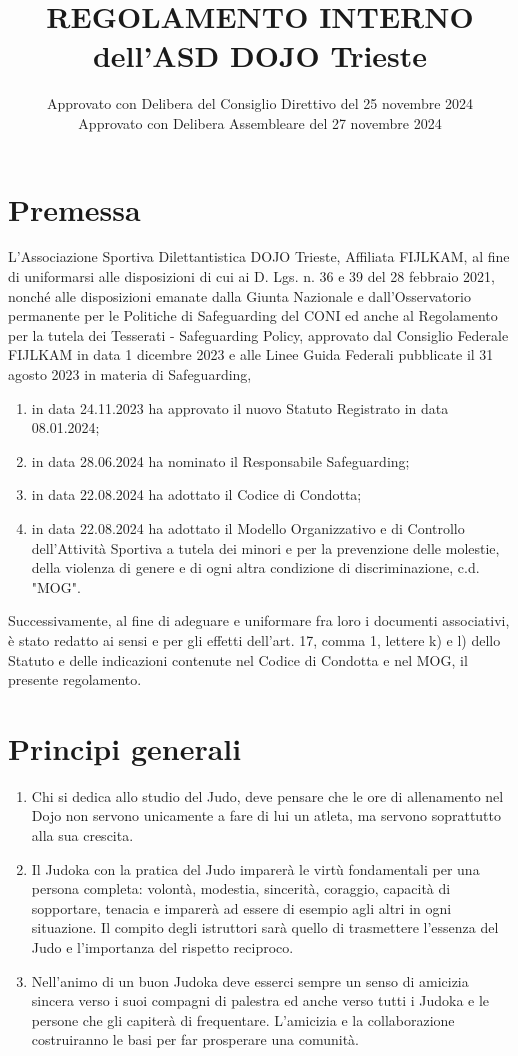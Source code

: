 \documentclass{djtsdoc}
\title{REGOLAMENTO INTERNO \\[2pt] dell'ASD DOJO Trieste}
\date{Approvato con Delibera del Consiglio Direttivo del 25 novembre 2024 \\ Approvato con Delibera Assembleare del 27 novembre 2024}
\begin{document}
	\maketitle
	
	\section*{Premessa}
	L'Associazione Sportiva Dilettantistica DOJO Trieste, Affiliata FIJLKAM, al fine di uniformarsi alle disposizioni di cui ai D. Lgs. n. 36 e 39 del 28 febbraio 2021, nonché alle disposizioni emanate dalla Giunta Nazionale e dall'Osservatorio permanente per le Politiche di Safeguarding del CONI ed anche al Regolamento per la tutela dei Tesserati - Safeguarding Policy, approvato dal Consiglio Federale FIJLKAM in data 1 dicembre 2023 e alle Linee Guida Federali pubblicate il 31 agosto 2023 in materia di Safeguarding,
	\begin{enumerate}[label = \alph*.]
		\item in data 24.11.2023 ha approvato il nuovo Statuto Registrato in data 08.01.2024;
		\item in data 28.06.2024 ha nominato il Responsabile Safeguarding;
		\item in data 22.08.2024 ha adottato il Codice di Condotta;
		\item in data 22.08.2024 ha adottato il Modello Organizzativo e di Controllo dell'Attività Sportiva a tutela dei minori e per la prevenzione delle molestie, della violenza di genere e di ogni altra condizione di discriminazione, c.d. "MOG".
	\end{enumerate}
	Successivamente, al fine di adeguare e uniformare fra loro i documenti associativi, è stato redatto ai sensi e per gli effetti dell'art. 17, comma 1, lettere k) e l) dello Statuto e delle indicazioni contenute nel Codice di Condotta e nel MOG, il presente regolamento.
	
	\section{Principi generali}
	\begin{enumerate}
		\item Chi si dedica allo studio del Judo, deve pensare che le ore di allenamento nel Dojo non servono unicamente a fare di lui un atleta, ma servono soprattutto alla sua crescita.
		\item Il Judoka con la pratica del Judo imparerà le virtù fondamentali per una persona completa: volontà, modestia, sincerità, coraggio, capacità di sopportare, tenacia e imparerà ad essere di esempio agli altri in ogni situazione. Il compito degli istruttori sarà quello di trasmettere l’essenza del Judo e l’importanza del rispetto reciproco.
		\item Nell'animo di un buon Judoka deve esserci sempre un senso di amicizia sincera verso i suoi compagni di palestra ed anche verso tutti i Judoka e le persone che gli capiterà di frequentare. L'amicizia e la collaborazione costruiranno le basi per far prosperare una comunità.
	\end{enumerate}
	
\end{document}

